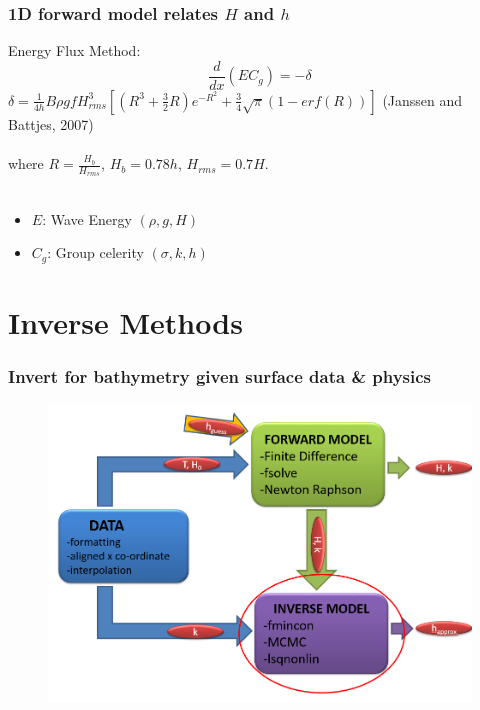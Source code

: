 \documentclass[7pt]{beamer}
\begin{document}
\begin{frame}
	\frametitle{1D forward model relates $H$ and $h$}
	Energy Flux Method:
	$$\frac{d}{dx}\left(EC_g\right)=-\delta $$
	\centering
		 $\delta = \frac{1}{4h}B\rho g f H^3_{rms}\left[(R^3+\frac{3}{2}R)e^{-R^2}+\frac{3}{4}\sqrt{\pi}(1-erf(R))\right]$
		 (Janssen and Battjes, 2007) \\
	$\,$\\
	where $R=\frac{H_b}{H_{rms}}$, $H_b=0.78h$, $H_{rms}=0.7H$. \\
	$\,$\\
	\begin{itemize}
		\item $E$: Wave Energy $(\rho,g,H)$
		\item  $C_{g}$: Group celerity $(\sigma,k,h)$
	\end{itemize}
\end{frame}

\section{Inverse Methods}

\begin{frame}
 	\frametitle{Invert for bathymetry given surface data \& physics}
		\begin{figure}
			\includegraphics[width=1.0\linewidth]{img/INV.png}
		\end{figure}
\end{frame}
\end{document}
